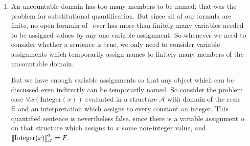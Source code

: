 {{\begin{enumerate}
Suppose $\valsa{\forall \xi\phi} ≠ \valsa{\forall \xi\psi}$. Then for one such variable assignment $\beta$ differing from $\alpha$ at most in what it assigns to $\xi$, $\vals{\phi}{A}{\beta}≠\vals{\psi}{A}{\beta}$. But since $\vals{\phi\bicond \psi}{A}{\beta} = T$, $\vals{\phi}{A}{\beta}=\vals{\psi}{A}{\beta}$. Contradiction; so $\valsa{\forall \xi\phi} = \valsa{\forall \xi\psi}$, and hence $\valsa{\forall \xi \phi \bicond \forall \xi \psi}=T$.

\setcounter{enumi}{14}
\item An uncountable domain has too many members to be named; that was the problem for substitutional quantification. But since all of our formula are finite, no open formula of \ltwo\ ever has more than finitely many variables needed to be assigned values by any one variable assignment. So whenever we need to consider whether a sentence is true, we only need to consider variable assignments which temporarily assign names to finitely many members of the uncountable domain.

But we have enough variable assignments so that any object which can be discussed even indirectly can be temporarily named. So consider the problem case $\forall x (\text{Integer}(x))$ evaluated in a structure $\mathscr{A}$ with domain of the reals $\mathbb{R}$ and an interpretation which assigns to every constant an integer. This quantified sentence  is nevertheless false, since there is a variable assignment $\alpha$ on that structure which assigns to $x$ some non-integer value, and $\left\llbracket\text{Integer}(x)\right\rrbracket^{\alpha}_{\mathscr{A}}=F$.



\end{enumerate}

}





}
